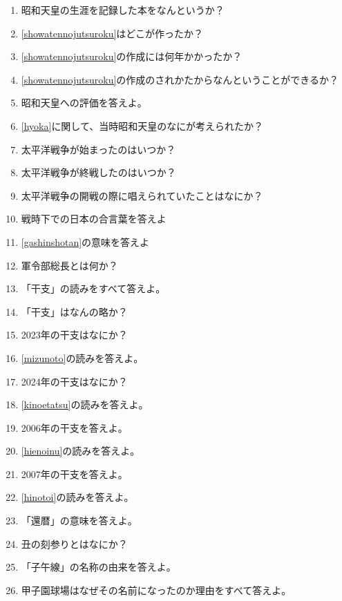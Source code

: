 \documentclass[]{jsarticle}
\begin{document}
\begin{enumerate}
	      \\
	\item 昭和天皇の生涯を記録した本をなんというか？\label{showatennojutsuroku}
	\item \ref{showatennojutsuroku}はどこが作ったか？
	\item \ref{showatennojutsuroku}の作成には何年かかったか？
	\item \ref{showatennojutsuroku}の作成のされかたからなんということができるか？
	\item 昭和天皇への評価を答えよ。\label{hyoka}
	\item \ref{hyoka}に関して、当時昭和天皇のなにが考えられたか？
	\item 太平洋戦争が始まったのはいつか？
	\item 太平洋戦争が終戦したのはいつか？
	\item 太平洋戦争の開戦の際に唱えられていたことはなにか？
	\item 戦時下での日本の合言葉を答えよ\label{gashinshotan}
	\item \ref{gashinshotan}の意味を答えよ
	\item 軍令部総長とは何か？
	\item 「干支」の読みをすべて答えよ。
	\item 「干支」はなんの略か？\
	\item 2023年の干支はなにか？\label{mizunoto}
	\item \ref{mizunoto}の読みを答えよ。
	\item 2024年の干支はなにか？\label{kinoetatsu}
	\item \ref{kinoetatsu}の読みを答えよ。
	\item 2006年の干支を答えよ。\label{hienoinu}
	\item \ref{hienoinu}の読みを答えよ。
	\item 2007年の干支を答えよ。\label{hinotoi}
	\item \ref{hinotoi}の読みを答えよ。
	\item 「還暦」の意味を答えよ。
	\item 丑の刻参りとはなにか？
	\item 「子午線」の名称の由来を答えよ。
	\item 甲子園球場はなぜその名前になったのか理由をすべて答えよ。
\end{enumerate}
\end{document}
